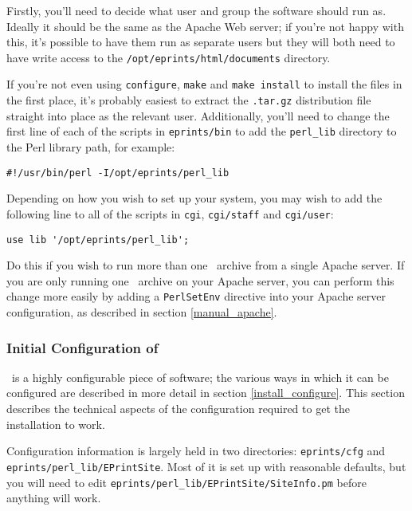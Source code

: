 Firstly, you'll need to decide what user and group the software should run as. Ideally it should be the same as the Apache Web server; if you're not happy with this, it's possible to have them run as separate users but they will both need to have write access to the {\tt /opt/eprints/html/documents} directory.

If you're not even using {\tt configure}, {\tt make} and {\tt make install} to install the files in the first place, it's probably easiest to extract the {\tt .tar.gz} distribution file straight into place as the relevant user. Additionally, you'll need to change the first line of each of the scripts in {\tt eprints/bin} to add the {\tt perl\_lib} directory to the Perl library path, for example:

\begin{verbatim}
#!/usr/bin/perl -I/opt/eprints/perl_lib
\end{verbatim}

Depending on how you wish to set up your system, you may wish to add the following line to all of the scripts in {\tt cgi}, {\tt cgi/staff} and {\tt cgi/user}:

\begin{verbatim}
use lib '/opt/eprints/perl_lib';
\end{verbatim}

Do this if you wish to run more than one \eprints\ archive from a single Apache server. If you are only running one \eprints\ archive on your Apache server, you can perform this change more easily by adding a {\tt PerlSetEnv} directive into your Apache server configuration, as described in section \ref{manual_apache}.



\subsubsection{Initial Configuration of \eprints}

\eprints\ is a highly configurable piece of software; the various ways in which it can be configured are described in more detail in section \ref{install_configure}. This section describes the technical aspects of the configuration required to get the installation to work.

Configuration information is largely held in two directories: {\tt eprints/cfg} and {\tt eprints/perl\_lib/EPrintSite}. Most of it is set up with reasonable defaults, but you will need to edit {\tt eprints/perl\_lib/EPrintSite/SiteInfo.pm} before anything will work.

